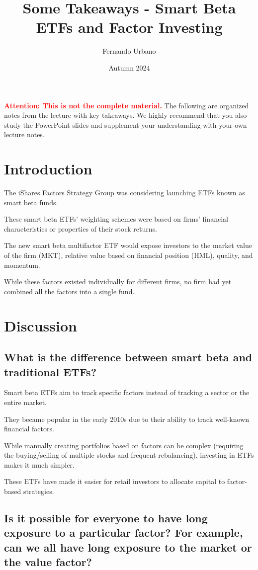 \documentclass{article}
\title{Some Takeaways - Smart Beta ETFs and Factor Investing}
\author{Fernando Urbano}
\date{Autumn 2024}
\newcommand{\redbold}[1]{\textbf{\textcolor{red}{#1}}}
\begin{document}
\maketitle

\redbold{Attention: This is not the complete material.} The following are organized notes from the lecture with key takeaways. We highly recommend that you also study the PowerPoint slides and supplement your understanding with your own lecture notes.

\section{Introduction}
The iShares Factors Strategy Group was considering launching ETFs known as smart beta funds.

These smart beta ETFs' weighting schemes were based on firms' financial characteristics or properties of their stock returns.

The new smart beta multifactor ETF would expose investors to the market value of the firm (MKT), relative value based on financial position (HML), quality, and momentum.

While these factors existed individually for different firms, no firm had yet combined all the factors into a single fund.

\section{Discussion}

\subsection{What is the difference between smart beta and traditional ETFs?}
Smart beta ETFs aim to track specific factors instead of tracking a sector or the entire market.

They became popular in the early 2010s due to their ability to track well-known financial factors.

While manually creating portfolios based on factors can be complex (requiring the buying/selling of multiple stocks and frequent rebalancing), investing in ETFs makes it much simpler.

These ETFs have made it easier for retail investors to allocate capital to factor-based strategies.

\subsection{Is it possible for everyone to have long exposure to a particular factor? For example, can we all have long exposure to the market or the value factor?}
\end{document}
